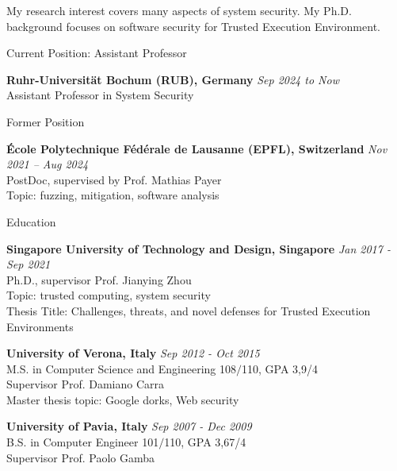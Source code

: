 \documentclass{resume} %
\begin{document}
	
My research interest covers many aspects of system security. My Ph.D. background
focuses on software security for Trusted Execution Environment. 

\begin{rSection}{Current Position: Assistant Professor}
	
	{\bf Ruhr-Universität Bochum (RUB), Germany} 
	\hfill {\em Sep 2024 to Now} \\
	Assistant Professor in System Security

\end{rSection}

\begin{rSection}{Former Position}
	
	{\bf \'Ecole Polytechnique F\'ed\'erale de Lausanne (EPFL), Switzerland} 
	\hfill {\em Nov 2021 -- Aug 2024} \\
	PostDoc, supervised by Prof. Mathias Payer \\
	Topic: fuzzing, mitigation, software analysis

\end{rSection}


\begin{rSection}{Education}
    
{\bf Singapore University of Technology and Design, Singapore} \hfill {\em Jan
2017 - Sep 2021} \\
Ph.D., supervisor Prof. Jianying Zhou \\
Topic: trusted computing, system security \\
Thesis Title: Challenges, threats, and novel defenses for Trusted Execution
Environments

{\bf University of Verona, Italy} \hfill {\em Sep 2012 - Oct 2015} \\
M.S. in Computer Science and Engineering 108$/$110, GPA 3,9/4 \\
Supervisor Prof. Damiano Carra \\
Master thesis topic: Google dorks, Web security


{\bf University of Pavia, Italy} \hfill {\em Sep 2007 - Dec 2009} \\ 
B.S. in Computer Engineer 101$/$110, GPA 3,67/4 \\
Supervisor Prof. Paolo Gamba \\


\end{rSection}
\end{document}

